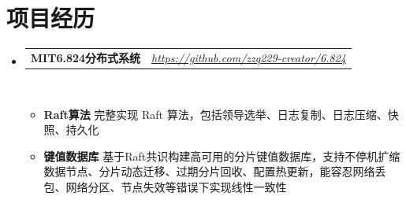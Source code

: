 \documentclass[letterpaper,11pt]{article}
\makeatletter
\newcommand{\resumeItem}[2]{
  \item\small{
    \textbf{#1}{ #2 \vspace{-2pt}}
  }
}
\newcommand{\resumeSubheadingtwo}[2]{
  \vspace{-1pt}\item
    \begin{tabular*}{0.97\textwidth}{l@{\extracolsep{\fill}}r}
      \textbf{#1} & \textit{ #2} \\
    \end{tabular*}\vspace{-5pt}
}
\newcommand{\resumeItemListStart}{\vspace{-10pt}\begin{itemize}}
\newcommand{\resumeItemListEnd}{\end{itemize}\vspace{-10pt}}
\makeatother
\begin{document}
\section{项目经历}
    \begin{itemize}[leftmargin=*,itemsep=5pt]
        \resumeSubheadingtwo
            {MIT6.824分布式系统}{\href{https://github.com/zzq229-creator/6.824}{https://github.com/zzq229-creator/6.824}}
            \\[10pt]
            \resumeItemListStart
                \resumeItem{Raft算法}
                    {完整实现 Raft 算法，包括领导选举、日志复制、日志压缩、快照、持久化}
                \resumeItem{键值数据库}
                    {基于Raft共识构建高可用的分片键值数据库，支持不停机扩缩数据节点、分片动态迁移、过期分片回收、配置热更新，能容忍网络丢包、网络分区、节点失效等错误下实现线性一致性
                    }
            \resumeItemListEnd

    \end{itemize}

\vspace{-10pt}
\end{document}
